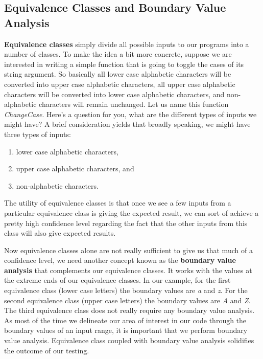 \documentclass{article}
\begin{document}
\subsection{Equivalence Classes and Boundary Value Analysis}
\textbf{Equivalence classes} simply divide all possible inputs to our programs into a number of classes.
To make the idea a bit more concrete, 
suppose we are interested in writing a simple function that is going to toggle the cases of its string argument.
So basically all lower case alphabetic characters will be converted into upper case alphabetic characters,
all upper case alphabetic characters will be converted into lower case alphabetic characters, and non-alphabetic characters
will remain unchanged. Let us name this function \textit{ChangeCase}.
Here's a question for you, what are the different types of inputs we might have?
A brief consideration yields that broadly speaking, we might have three types of inputs:
\begin{enumerate}
	\item lower case alphabetic characters,
	\item upper case alphabetic characters, and
	\item non-alphabetic characters.
\end{enumerate}
The utility of equivalence classes is that once we see a few inputs from a particular equivalence class is giving the expected result,
we can sort of achieve a pretty high confidence level regarding the fact that the other inputs from this class will also give
expected results.

Now equivalence classes alone are not really sufficient to give us that much of a confidence level,
we need another concept known as the \textbf{boundary value analysis} that complements our equivalence classes.
It works with the values at the extreme ends of our equivalence classes.
In our example, for the first equivalence class (lower case letters) the boundary values are \textit{a} and \textit{z}.
For the second equivalence class (upper case letters) the boundary values are \textit{A} and \textit{Z}.
The third equivalence class does not really require any boundary value analysis.
As most of the time we delineate our area of interest in our code through the boundary values of an input range,
it is important that we perform boundary value analysis.
Equivalence class coupled with boundary value analysis solidifies the outcome of our testing.
\end{document}
